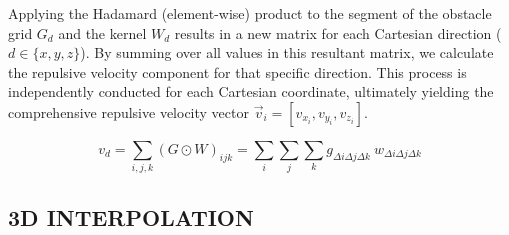 \documentclass[letterpaper, 10 pt, conference]{ieeeconf}  %
\begin{document}
Applying the Hadamard (element-wise) product to the segment of the obstacle grid \(G_d\) and the kernel \(W_d\) results in a new matrix for each Cartesian direction (\(d \in \{x, y, z\}\)). By summing over all values in this resultant matrix, we calculate the repulsive velocity component for that specific direction. This process is independently conducted for each Cartesian coordinate, ultimately yielding the comprehensive repulsive velocity vector \(\vec{v}_i = [ v_{x_i}, v_{y_i}, v_{z_i}]\).

\begin{equation}
	v_d = \sum_{i,j,k} (G \odot W)_{ijk} = \sum_{i}\sum_{j}\sum_{k} g_{\Delta i \Delta j \Delta k} ~  w_{\Delta i \Delta j \Delta k}
	\label{eq:matrix-product}
\end{equation}


%



\subsection{3D INTERPOLATION} 


%
\end{document}
